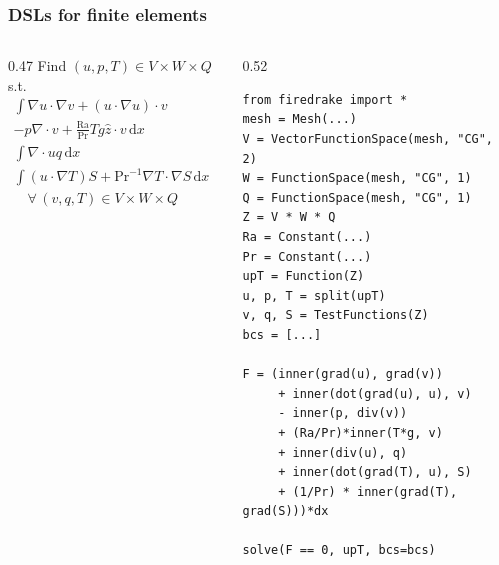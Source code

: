 \documentclass[presentation]{beamer}
\begin{document}
\begin{frame}[fragile]
  \frametitle{DSLs for finite elements}
  \begin{columns}
    \begin{column}{0.47\framewidth}
      {\footnotesize
        Find $(u, p, T) \in V\times W\times Q$ s.t.
        \begin{align*}
          \int\!\nabla u \cdot \nabla v + (u \cdot \nabla u) \cdot v \\
          - p\nabla\cdot v + \frac{\text{Ra}}{\text{Pr}} Tg \hat{z} \cdot v\,\text{d}x &= 0 \\
          \int\!\nabla\cdot u q\,\text{d}x&= 0\\
          \int\! (u\cdot \nabla T) S + \text{Pr}^{-1} \nabla T \cdot \nabla
          S\,\text{d}x &= 0\\
          \quad \forall\, (v,q,T) \in V\times W \times Q
        \end{align*}
        }
    \end{column}
      \begin{column}{0.52\framewidth}
\begin{verbatim}
from firedrake import *
mesh = Mesh(...)
V = VectorFunctionSpace(mesh, "CG", 2)
W = FunctionSpace(mesh, "CG", 1)
Q = FunctionSpace(mesh, "CG", 1)
Z = V * W * Q
Ra = Constant(...)
Pr = Constant(...)
upT = Function(Z)
u, p, T = split(upT)
v, q, S = TestFunctions(Z)
bcs = [...]

F = (inner(grad(u), grad(v))
     + inner(dot(grad(u), u), v)
     - inner(p, div(v))
     + (Ra/Pr)*inner(T*g, v)
     + inner(div(u), q)
     + inner(dot(grad(T), u), S)
     + (1/Pr) * inner(grad(T), grad(S)))*dx

solve(F == 0, upT, bcs=bcs)
\end{verbatim}
      \end{column}
  \end{columns}
\end{frame}
\end{document}
